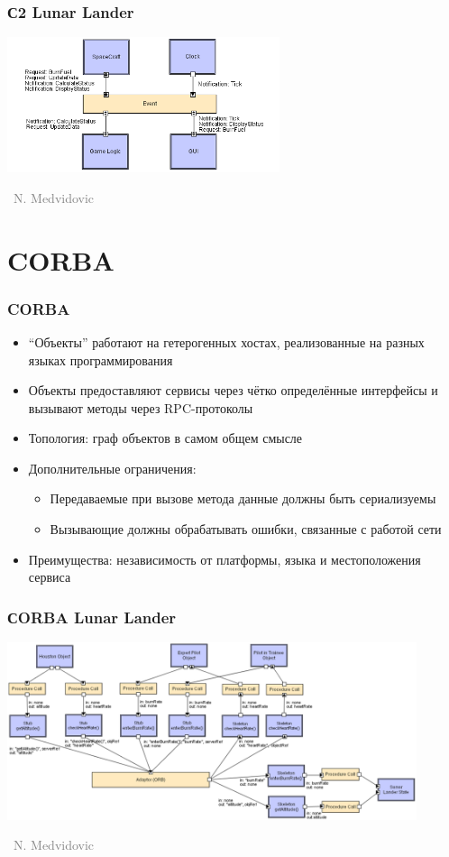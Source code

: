 \documentclass[xetex,mathserif,serif]{beamer}
\newcommand{\attribution}[1] {
	\vspace{-5mm}\begin{flushright}\begin{scriptsize}\textcolor{gray}{\textcopyright\, #1}\end{scriptsize}\end{flushright}
}
\begin{document}
	\begin{frame}
		\frametitle{С2 Lunar Lander}
		\begin{center}
			\includegraphics[width=0.6\textwidth]{c2LL.png}
			\attribution{N. Medvidovic}
		\end{center}
	\end{frame}

	\section{CORBA}

	\begin{frame}
		\frametitle{CORBA}
		\begin{itemize}
			\item ``Объекты'' работают на гетерогенных хостах, реализованные на разных языках программирования 
			\item Объекты предоставляют сервисы через чётко определённые интерфейсы и вызывают методы через RPC-протоколы
			\item Топология: граф объектов в самом общем смысле
			\item Дополнительные ограничения:
			\begin{itemize}
				\item Передаваемые при вызове метода данные должны быть сериализуемы
				\item Вызывающие должны обрабатывать ошибки, связанные с работой сети
			\end{itemize}
			\item Преимущества: независимость от платформы, языка и местоположения сервиса
		\end{itemize}
	\end{frame}

	\begin{frame}
		\frametitle{СORBA Lunar Lander}
		\begin{center}
			\includegraphics[width=0.9\textwidth]{corbaLL.png}
			\attribution{N. Medvidovic}
		\end{center}
	\end{frame}
\end{document}
